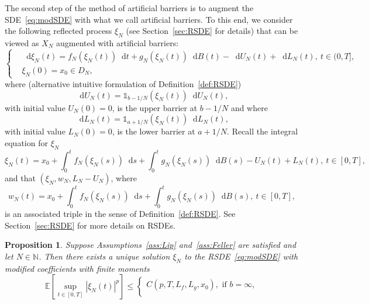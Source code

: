 \documentclass[11pt]{amsart}
\newtheorem{proposition}[theorem]{Proposition}
\newcommand{\E}{{\mathbb E}}
\newcommand*\diff{\mathop{}\!\mathrm{d}}
\newcommand{\DDN}{D_{N}}
\begin{document}
{The second step of the method of artificial barriers is to augment the SDE~\eqref{eq:modSDE} with what we call artificial barriers. To this end, we consider the following reflected process $\xi_{N}$ (see Section~\ref{sec:RSDE} for details) that can be viewed as $X_{N}$ augmented with artificial barriers:
\begin{equation}\label{eq:RmodSDE}
\left\lbrace
\begin{aligned}
& \diff \xi_{N}(t) = f_{N}(\xi_{N}(t)) \diff t + g_{N}(\xi_{N}(t)) \diff B(t) - \diff U_{N}(t) + \diff L_{N}(t),\ t \in (0,T], \\ 
& \xi_{N}(0) = x_{0} \in \DDN,
\end{aligned}
\right.
\end{equation}
where (alternative intuitive formulation of Definition~\ref{def:RSDE})
\begin{equation*}
\diff U_{N}(t) = \mathbb{1}_{b - 1/N}(\xi_{N}(t)) \diff U_{N}(t),
\end{equation*}
with initial value $U_{N}(0)=0$, is the upper barrier at $b - 1/N$ and where
\begin{equation*}
\diff L_{N}(t) = \mathbb{1}_{a + 1/N}(\xi_{N}(t)) \diff L_{N}(t),
\end{equation*}
with initial value $L_{N}(0)=0$, is the lower barrier at $a + 1/N$. Recall the integral equation for $\xi_{N}$
\begin{equation*}
\xi_{N}(t) = x_{0} + \int_{0}^{t} f_{N}(\xi_{N}(s)) \diff s + \int_{0}^{t} g_{N}(\xi_{N}(s)) \diff B(s) - U_{N}(t) + L_{N}(t),\ t \in [0,T],
\end{equation*}
and that $(\xi_{N},w_{N},L_{N}-U_{N})$, where
\begin{equation}\label{eq:wNdef}
w_{N}(t) = x_{0} + \int_{0}^{t} f_{N}(\xi_{N}(s)) \diff s + \int_{0}^{t} g_{N}(\xi_{N}(s)) \diff B(s),\ t \in [0,T],
\end{equation}
is an associated triple in the sense of Definition~\ref{def:RSDE}. See Section~\ref{sec:RSDE} for more details on RSDEs. 
\begin{proposition}\label{prop:xiNproperties}
Suppose Assumptions~\ref{ass:Lip} and~\ref{ass:Feller} are satisfied and let $N \in \mathbb{N}$. Then there exists a unique solution $\xi_{N}$ to the RSDE~\eqref{eq:modSDE} with modified coefficients with finite moments
\begin{equation}\label{eq:xNmomBound}
\E \left[ \sup_{t \in [0,T]} |\xi_{N}(t)|^{p} \right] \leq
\begin{cases}
C(p,T,L_{f},L_{g},x_{0}), \text{ if } b = \infty,\\

\end{cases}
\end{equation}
\end{proposition}}
\end{document}
